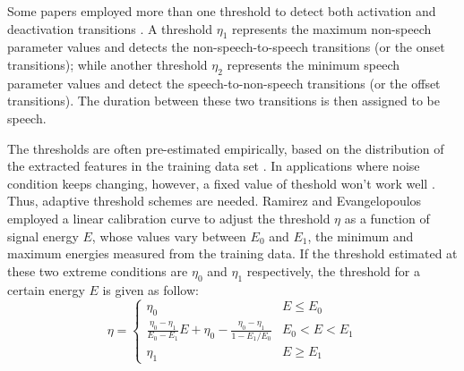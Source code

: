 Some papers employed more than one threshold to detect both activation and deactivation transitions \cite{huang2000novel,rabiner1975algorithm}. A threshold $\eta_1$ represents the maximum non-speech parameter values and detects the non-speech-to-speech transitions (or the onset transitions); while another threshold $\eta_2$ represents the minimum speech parameter values and detect the speech-to-non-speech transitions (or the offset transitions). The duration between these two transitions is then assigned to be speech.

The thresholds are often pre-estimated empirically, based on the distribution of the extracted features in the training data set \cite{sohn1998voice,ishizuka2006study}. In applications where noise condition keeps changing, however, a fixed value of theshold won't work well \cite{ghosh2011robust}. Thus, adaptive threshold schemes are needed. Ramirez \etal \cite{ramirez2004efficient} and Evangelopoulos \etal \cite{evangelopoulos2005speech} employed a linear calibration curve to adjust the threshold $\eta$ as a function of signal energy $E$, whose values vary between $E_0$ and $E_1$, the minimum and maximum energies measured from the training data. If the threshold estimated at these two extreme conditions are $\eta_0$ and $\eta_1$ respectively, the threshold for a certain energy $E$ is given as follow:
\begin{equation}\label{eq:threshold_calibration}
	\eta = \left\{
        \begin{array}{ll}
            \eta_0  & E \le E_0 \\
            \frac{\eta_0-\eta_1}{E_0-E_1} E + \eta_0 - \frac{\eta_0-\eta_1}{1-E_1/E_0} & E_0<E<E_1 \\
            \eta_1  & E \ge E_1
        \end{array}
    \right.
\end{equation}

